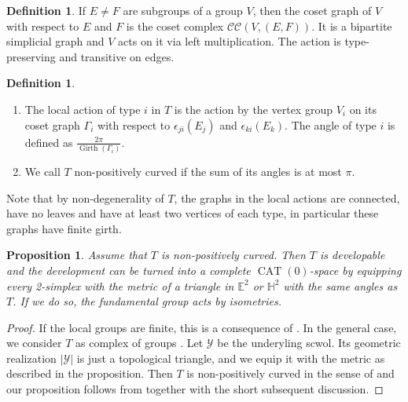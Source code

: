 \documentclass[dvipsnames]{article}
\newtheorem{proposition}[theorem]{Proposition}
\theoremstyle{definition}
\newtheorem{definition}[theorem]{Definition}
\theoremstyle{remark}
\DeclareMathOperator{\CAT}{CAT}
\DeclareMathOperator{\Girth}{Girth}
\begin{document}
    \begin{definition}
        If $E\neq F$ are subgroups of a group $V$, then the coset graph of $V$ with respect to $E$ and $F$ is the coset complex $\mathcal C \mathcal C(V, (E,F))$.
        It is a bipartite simplicial graph and $V$ acts on it via left multiplication. The action is type-preserving and transitive on edges.
    \end{definition}

    \begin{definition}
        \begin{enumerate}
            \item The local action of type $i$ in $T$ is the action by the vertex group $V_i$ on its coset graph $\Gamma_i$ with respect to $\epsilon_{ji}(E_j)$ and $\epsilon_{ki}(E_k)$. 
            The angle of type $i$ is defined as $\frac{2\pi}{\Girth(\Gamma_i)}$.
            \item We call $T$ non-positively curved if the sum of its angles is at most $\pi$.
        \end{enumerate}
    \end{definition}

    Note that by non-degenerality of $T$, the graphs in the local actions are connected, have no leaves and have at least two vertices of each type, in particular these graphs have finite girth.

    \begin{proposition}\label{prop:dev_cat0}
        Assume that $T$ is non-positively curved. Then $T$ is developable and the development can be turned into a complete $\CAT(0)$-space by equipping every 2-simplex with the metric of a triangle in $\mathbb E^2$ or $\mathbb H^2$ with the same angles as $T$. If we do so, the fundamental group acts by isometries.
    \end{proposition}

    \begin{proof}
        If the local groups are finite, this is a consequence of \cite[Theorem II.12.28]{BridsonHaefliger}. In the general case, we consider $T$ as complex of groups \cite[Chapter III.C]{BridsonHaefliger}. Let $\mathcal Y$ be the underyling scwol. Its geometric realization $|\mathcal Y|$ is just a topological triangle, and we equip it with the metric as described in the proposition. Then $T$ is non-positively curved in the sense of \cite[Chapter III.C, Definition 4.16]{BridsonHaefliger} and our proposition follows from \cite[Chapter III.C, Theorem 4.17]{BridsonHaefliger} together with the short subsequent discussion.
    \end{proof}
\end{document}
